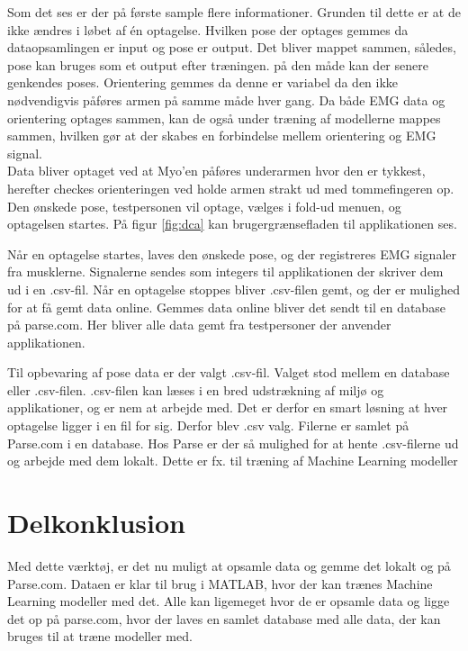 Som det ses er der på første sample flere informationer. Grunden til dette er at de ikke ændres i løbet af én optagelse. Hvilken pose der optages gemmes da dataopsamlingen er input og pose er output. Det bliver mappet sammen, således, pose kan bruges som et output efter træningen. på den måde kan der senere genkendes poses. Orientering gemmes da denne er variabel da den ikke nødvendigvis påføres armen på samme måde hver gang. Da både EMG data og orientering optages sammen, kan de også under træning af modellerne mappes sammen, hvilken gør at der skabes en forbindelse mellem orientering og EMG signal.\\
Data bliver optaget ved at Myo'en påføres underarmen hvor den er tykkest, herefter checkes orienteringen ved holde armen strakt ud med tommefingeren op. Den ønskede pose, testpersonen vil optage, vælges i fold-ud menuen, og optagelsen startes. På figur \ref{fig:dca} kan brugergrænsefladen til applikationen ses.


Når en optagelse startes, laves den ønskede pose, og der registreres EMG signaler fra musklerne. Signalerne sendes som integers til applikationen der skriver dem ud i en .csv-fil. Når en optagelse stoppes bliver .csv-filen gemt, og der er mulighed for at få gemt data online. Gemmes data online bliver det sendt til en database på parse.com\citep{RefWorks:11}. Her bliver alle data gemt fra testpersoner der anvender applikationen.

Til opbevaring af pose data er der valgt .csv-fil. Valget stod mellem en database eller .csv-filen. .csv-filen kan læses i en bred udstrækning af miljø og applikationer, og er nem at arbejde med. Det er derfor en smart løsning at hver optagelse ligger i en fil for sig. Derfor blev .csv valg. Filerne er samlet på Parse.com i en database. Hos Parse er der så mulighed for at hente .csv-filerne ud og arbejde med dem lokalt. Dette er fx. til træning af Machine Learning modeller

\section{Delkonklusion}
Med dette værktøj, er det nu muligt at opsamle data og gemme det lokalt og på Parse.com. Dataen er klar til brug i MATLAB, hvor der kan trænes Machine Learning modeller med det. Alle kan ligemeget hvor de er opsamle data og ligge det op på parse.com, hvor der laves en samlet database med alle data, der kan bruges til at træne modeller med. 